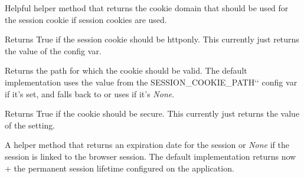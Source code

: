 \documentclass[a4paper,12pt]{sphinxmanual}
\begin{document}
\begin{fulllineitems}
\begin{fulllineitems}
\label{api:flask.sessions.SessionInterface.get_cookie_domain}
Helpful helper method that returns the cookie domain that should
be used for the session cookie if session cookies are used.

\end{fulllineitems}


\begin{fulllineitems}
\label{api:flask.sessions.SessionInterface.get_cookie_httponly}
Returns True if the session cookie should be httponly.  This
currently just returns the value of the 
config var.

\end{fulllineitems}


\begin{fulllineitems}
\label{api:flask.sessions.SessionInterface.get_cookie_path}
Returns the path for which the cookie should be valid.  The
default implementation uses the value from the SESSION\_COOKIE\_PATH{}`{}`
config var if it's set, and falls back to  or
uses \code{/} if it's \emph{None}.

\end{fulllineitems}


\begin{fulllineitems}
\label{api:flask.sessions.SessionInterface.get_cookie_secure}
Returns True if the cookie should be secure.  This currently
just returns the value of the  setting.

\end{fulllineitems}


\begin{fulllineitems}
\label{api:flask.sessions.SessionInterface.get_expiration_time}
A helper method that returns an expiration date for the session
or \emph{None} if the session is linked to the browser session.  The
default implementation returns now + the permanent session
lifetime configured on the application.


\end{fulllineitems}
\end{fulllineitems}
\end{document}
